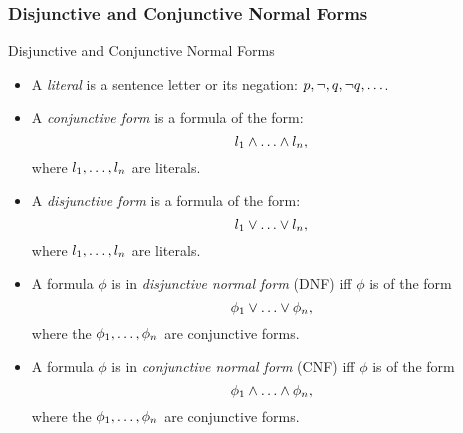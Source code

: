\documentclass[../slides.tex]{subfiles}
\begin{document}
\subsubsection{Disjunctive and Conjunctive Normal Forms}
\begin{frame}{Disjunctive and Conjunctive Normal Forms}

  \begin{itemize}

  \item A \emph{literal} is a sentence letter or its negation:
    $p,\neg, q, \neg q, \mathellipsis$.

   \item A \emph{conjunctive form} is a formula of the
     form: \[l_1\land \mathellipsis\land l_n,\] where $l_1,
     \mathellipsis, l_n$ are literals.

    \item  A \emph{disjunctive form} is a formula of the
     form: \[l_1\lor \mathellipsis\lor l_n,\] where $l_1,
     \mathellipsis, l_n$ are literals.

     \item A formula $\phi$ is in \emph{disjunctive
         normal form} (DNF) iff $\phi$ is of the
       form \[\phi_1\lor\mathellipsis\lor\phi_n,\] where the $\phi_1,
       \mathellipsis, \phi_n$ are conjunctive forms.

       \item A formula $\phi$ is in \emph{conjunctive
         normal form} (CNF) iff $\phi$ is of the
       form \[\phi_1\land\mathellipsis\land\phi_n,\] where the $\phi_1,
       \mathellipsis, \phi_n$ are conjunctive forms.

    
  \end{itemize}

\end{frame}
\end{document}
